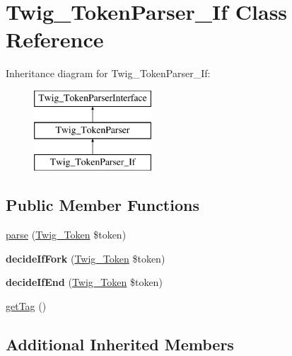 \hypertarget{class_twig___token_parser___if}{}\section{Twig\+\_\+\+Token\+Parser\+\_\+\+If Class Reference}
\label{class_twig___token_parser___if}
Inheritance diagram for Twig\+\_\+\+Token\+Parser\+\_\+\+If\+:\begin{figure}[H]
\begin{center}
\leavevmode
\includegraphics[height=3.000000cm]{class_twig___token_parser___if}
\end{center}
\end{figure}
\subsection*{Public Member Functions}
\begin{DoxyCompactItemize}
\item 
\hyperlink{class_twig___token_parser___if_a5dfa2e269321584fb74e8b43dabe0efd}{parse} (\hyperlink{class_twig___token}{Twig\+\_\+\+Token} \$token)
\item 
\hypertarget{class_twig___token_parser___if_a36fbfdd07a5a5ad35606f1cf9b9375c6}{}{\bfseries decide\+If\+Fork} (\hyperlink{class_twig___token}{Twig\+\_\+\+Token} \$token)\label{class_twig___token_parser___if_a36fbfdd07a5a5ad35606f1cf9b9375c6}

\item 
\hypertarget{class_twig___token_parser___if_a7b1dcebce78e66f752376f9e39b3b2a8}{}{\bfseries decide\+If\+End} (\hyperlink{class_twig___token}{Twig\+\_\+\+Token} \$token)\label{class_twig___token_parser___if_a7b1dcebce78e66f752376f9e39b3b2a8}

\item 
\hyperlink{class_twig___token_parser___if_ab86ba36154b20e6bbfa3ba705f12f9d6}{get\+Tag} ()
\end{DoxyCompactItemize}
\subsection*{Additional Inherited Members}


